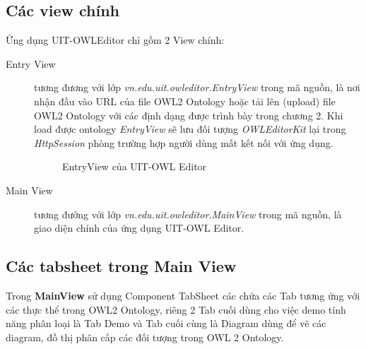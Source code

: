 \subsection{Các view chính}
Ứng dụng UIT-OWLEditor chỉ gồm 2 View chính: 
\begin{description}
\item[Entry View] tương đương với lớp \textit{vn.edu.uit.owleditor.EntryView} trong mã nguồn, là nơi nhận đầu vào URL của file OWL2 Ontology hoặc tải lên (upload) file OWL2 Ontology với các định dạng được trình bày trong chương 2. Khi load được ontology \textit{EntryView} sẽ lưu đối tượng \textit{OWLEditorKit} lại trong \textit{HttpSession} phòng trường hợp người dùng mất kết nối với ứng dụng.
\begin{figure}[h!]
	\centering
	\caption{EntryView của UIT-OWL Editor\label{overflow}}
\end{figure}
\item[Main View] tương đướng với lớp \textit{vn.edu.uit.owleditor.MainView} trong mã nguồn, là giao diện chính của ứng dụng UIT-OWL Editor.
\end{description}
%
\subsection{Các tabsheet trong Main View}
Trong \textbf{MainView} sử dụng Component TabSheet các chứa các Tab tương ứng với các thực thể trong OWL2 Ontology, riêng 2 Tab cuối dùng cho việc demo tính năng phân loại là Tab Demo và Tab cuối cùng là Diagram dùng để vẽ các diagram, đồ thị phân cấp các đối tượng trong OWL 2 Ontology.

